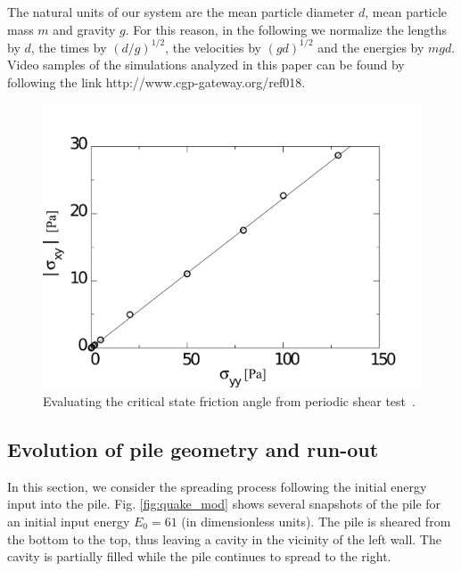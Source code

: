 The natural units of our system are the mean particle diameter $d$, 
mean particle mass $m$ and gravity $g$. For this reason, 
in the following we normalize the lengths by $d$, the times by $(d/g)^{1/2}$, 
the velocities by $(gd)^{1/2}$ and the energies by $mgd$.    
Video samples of the simulations analyzed in this paper
can be found by following the link http://www.cgp-gateway.org/ref018.

\begin{figure}[tbph]
\centering
\includegraphics[width=\textwidth]{Sxy_vs_Syy_Slope}
\caption{Evaluating the critical state friction angle from periodic shear 
test~\citep{Mutabaruka2013}.}
\label{fig:Sxy_vs_Syy_Slope}
\end{figure}

\subsection{Evolution of pile geometry and run-out}
\label{sec:evolution}

In this section, we consider the spreading process following the initial energy 
input into the pile. Fig. \ref{fig:quake_mod} shows several snapshots of the 
pile for an initial input energy $E_0 = 61$ (in dimensionless units).
The pile is sheared from the bottom to the top, thus leaving a cavity in the 
vicinity of the left wall. The cavity is partially filled while the pile 
continues to spread to the right. 


